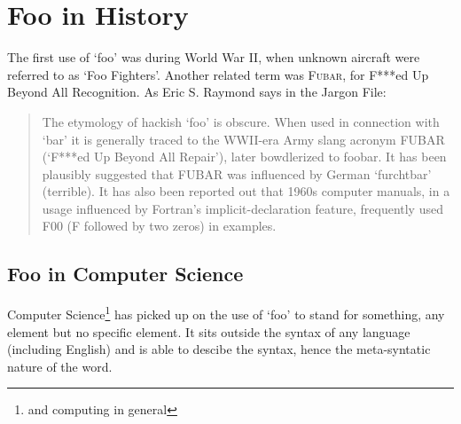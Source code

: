 \documentclass[twoside]{uocthesis}
\begin{document}
\prelimpages

\titlepage

\dedication{To Spiny Norman.}


\tableofcontents


\textpages

\chapter{Foo in History}
\label{sec:hist}
The first use of `foo' was during World War II, when unknown aircraft
were referred to as `Foo Fighters'.
Another related term was \textsc{Fubar}, for F***ed Up Beyond All
Recognition.
As Eric S. Raymond says in the Jargon File\cite{raymond00:jargon}:
\begin{quote}
  The etymology of hackish `foo' is obscure. When used in connection
  with `bar' it is generally traced to the WWII-era Army slang acronym
  FUBAR (`F***ed Up Beyond All Repair'), later bowdlerized to
  foobar. 
  It has been plausibly suggested that FUBAR  was influenced by German
  `furchtbar' (terrible). 
  It has also been reported out that 1960s computer manuals, in a
  usage influenced by Fortran's implicit-declaration feature,
  frequently used F00 (F followed by two zeros) in examples. 
\end{quote}

\section{Foo in Computer Science}
\label{sec:cosc}
Computer Science\footnote{and computing in general} has picked up on
the use of `foo' to stand for something, any element but no specific
element.
It sits outside the syntax of any language (including English) and is
able to descibe the syntax, hence the meta-syntatic nature of the
word.


\end{document}
